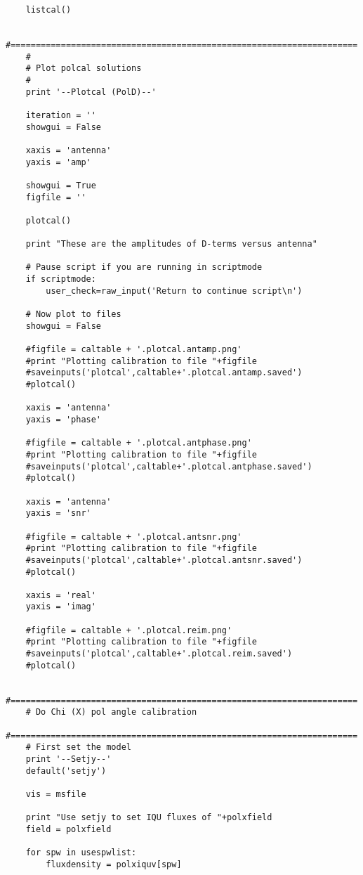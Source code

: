 \begin{verbatim}
    listcal()
    
    #=====================================================================
    #
    # Plot polcal solutions
    #
    print '--Plotcal (PolD)--'
    
    iteration = ''
    showgui = False
    
    xaxis = 'antenna'
    yaxis = 'amp'

    showgui = True
    figfile = ''

    plotcal()

    print "These are the amplitudes of D-terms versus antenna"

    # Pause script if you are running in scriptmode
    if scriptmode:
        user_check=raw_input('Return to continue script\n')

    # Now plot to files
    showgui = False

    #figfile = caltable + '.plotcal.antamp.png'
    #print "Plotting calibration to file "+figfile
    #saveinputs('plotcal',caltable+'.plotcal.antamp.saved')
    #plotcal()

    xaxis = 'antenna'
    yaxis = 'phase'

    #figfile = caltable + '.plotcal.antphase.png'
    #print "Plotting calibration to file "+figfile
    #saveinputs('plotcal',caltable+'.plotcal.antphase.saved')
    #plotcal()

    xaxis = 'antenna'
    yaxis = 'snr'

    #figfile = caltable + '.plotcal.antsnr.png'
    #print "Plotting calibration to file "+figfile
    #saveinputs('plotcal',caltable+'.plotcal.antsnr.saved')
    #plotcal()

    xaxis = 'real'
    yaxis = 'imag'

    #figfile = caltable + '.plotcal.reim.png'
    #print "Plotting calibration to file "+figfile
    #saveinputs('plotcal',caltable+'.plotcal.reim.saved')
    #plotcal()

    #=====================================================================
    # Do Chi (X) pol angle calibration
    #=====================================================================
    # First set the model
    print '--Setjy--'
    default('setjy')
        
    vis = msfile
        
    print "Use setjy to set IQU fluxes of "+polxfield
    field = polxfield
    
    for spw in usespwlist:
        fluxdensity = polxiquv[spw]
        

\end{verbatim}
